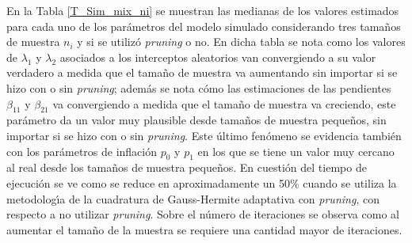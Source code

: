 En la Tabla \ref{T_Sim_mix_ni} se muestran las medianas de los valores estimados para cada uno de los par\'{a}metros del modelo simulado considerando tres tama\~{n}os de muestra $n_i$ y si se utiliz\'{o} \textit{pruning} o no. En dicha tabla se nota como los valores de $\lambda_1$ y $\lambda_2$ asociados a los interceptos aleatorios van convergiendo a su valor verdadero a medida que el tama\~{n}o de muestra va aumentando sin importar si se hizo con o sin \textit{pruning}; adem\'{a}s se nota c\'{o}mo las estimaciones de las pendientes $\beta_{11}$ y $\beta_{21}$ va convergiendo a medida que el tama\~{n}o de muestra va creciendo, este par\'{a}metro da un valor muy plausible desde tama\~{n}os de muestra peque\~{n}os, sin importar si se hizo con o sin \textit{pruning}. Este \'{u}ltimo fen\'{o}meno se evidencia tambi\'{e}n con los par\'{a}metros de inflaci\'{o}n $p_0$ y $p_1$ en los que se tiene un valor muy cercano al real desde los tama\~{n}os de muestra peque\~{n}os. En cuesti\'{o}n del tiempo de ejecuci\'{o}n se ve como se reduce en aproximadamente un 50\% cuando se utiliza la metodolog\'{\i}a de la cuadratura de Gauss-Hermite adaptativa con \textit{pruning}, con respecto a no utilizar \textit{pruning}. Sobre el n\'{u}mero de iteraciones se observa como al aumentar el tama\~{n}o de la muestra se requiere una cantidad mayor de iteraciones.\\

